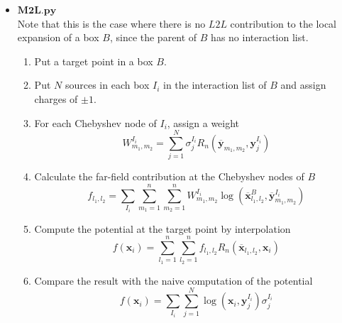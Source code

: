 \documentclass[11pt, oneside]{article}   	%
\begin{document}
\begin{appendices}
\begin{itemize}
\item $\mathbf{M2L.py}$\\
Note that this is the case where there is no $L2L$ contribution to the local expansion of a box $B$, since the parent of $B$ has no interaction list.
\begin{enumerate}
\item Put a target point in a box $B$.
\item Put $N$ sources in each box $I_i$ in the interaction list of $B$ and assign charges of $\pm 1$.
\item For each Chebyshev node of $I_i$, assign a weight
$$W^{I_i}_{m_1,m_2}=\sum_{j=1}^N \sigma^{I_i}_j R_n(\mathbf{\overline{y}}_{m_1,m_2},\mathbf{y}^{I_i}_j)$$
\item Calculate the far-field contribution at the Chebyshev nodes of $B$
$$f_{l_1,l_2}=\sum_{I_i}\sum_{m_1=1}^n\sum_{m_2=1}^n W^{I_i}_{m_1,m_2} \log(\mathbf{\overline{x}}^{B}_{l_1,l_2},\mathbf{\overline{y}}^{I_i}_{m_1,m_2})$$
\item Compute the potential at the target point by interpolation
$$f(\mathbf{x}_i)=\sum_{l_1=1}^n\sum_{l_2=1}^n f_{l_1,l_2} R_n(\mathbf{\overline{x}}_{l_1,l_2},\mathbf{x}_i)$$
\item Compare the result with the naive computation of the potential\\
$$f(\mathbf{x}_i)=\sum_{I_i}\sum_{j=1}^N \log(\mathbf{x}_i,\mathbf{y}^{I_i}_j) \sigma^{I_i}_j$$
\end{enumerate}


\end{itemize}
\end{appendices}
\end{document}

